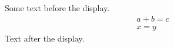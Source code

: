 \documentclass[12pt]{article}
\begin{document}
Some text before the display.
\begin{gather*} a + b = c \\ x = y \end{gather*}
Text after the display.
\end{document}

